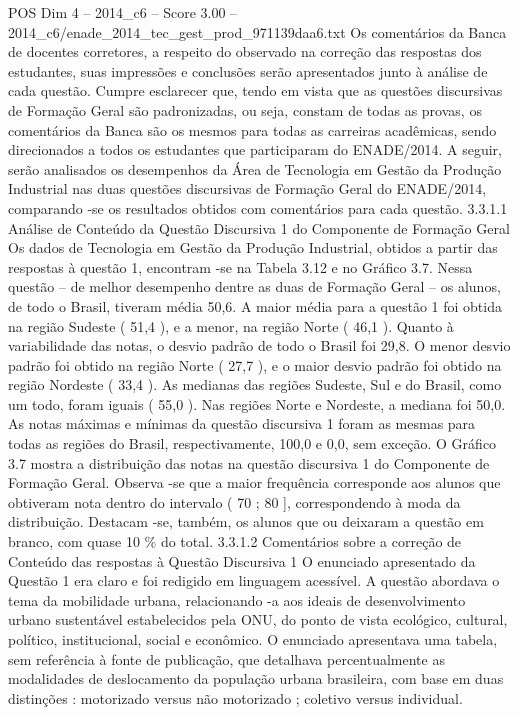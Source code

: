 \begin{textsample}{POS Dim 4 – 2014\_c6 – Score 3.00 – 2014\_c6/enade\_2014\_tec\_gest\_prod\_971139daa6.txt}
Os comentários da Banca de docentes corretores, a respeito do observado na correção das respostas dos estudantes, suas impressões e conclusões serão apresentados junto à análise de cada questão.
Cumpre esclarecer que, tendo em vista que as questões discursivas de Formação Geral são padronizadas, ou seja, constam de todas as provas, os comentários da Banca são os mesmos para todas as carreiras acadêmicas, sendo direcionados a todos os estudantes que participaram do ENADE/2014.
A seguir, serão analisados os desempenhos da Área de Tecnologia em Gestão da Produção Industrial nas duas questões discursivas de Formação Geral do ENADE/2014, comparando -se os resultados obtidos com comentários para cada questão. 3.3.1.1 Análise de Conteúdo da Questão Discursiva 1 do Componente de Formação Geral Os dados de Tecnologia em Gestão da Produção Industrial, obtidos a partir das respostas à questão 1, encontram -se na Tabela 3.12 e no Gráfico 3.7.
Nessa questão – de melhor desempenho dentre as duas de Formação Geral – os alunos, de todo o Brasil, tiveram média 50,6.
A maior média para a questão 1 foi obtida na região Sudeste ( 51,4 ), e a menor, na região Norte ( 46,1 ).
Quanto à variabilidade das notas, o desvio padrão de todo o Brasil foi 29,8.
O menor desvio padrão foi obtido na região Norte ( 27,7 ), e o maior desvio padrão foi obtido na região Nordeste ( 33,4 ).
As medianas das regiões Sudeste, Sul e do Brasil, como um todo, foram iguais ( 55,0 ).
Nas regiões Norte e Nordeste, a mediana foi 50,0.
As notas máximas e mínimas da questão discursiva 1 foram as mesmas para todas as regiões do Brasil, respectivamente, 100,0 e 0,0, sem exceção.
O Gráfico 3.7 mostra a distribuição das notas na questão discursiva 1 do Componente de Formação Geral.
Observa -se que a maior frequência corresponde aos alunos que obtiveram nota dentro do intervalo ( 70 ; 80 ], correspondendo à moda da distribuição.
Destacam -se, também, os alunos que ou deixaram a questão em branco, com quase 10 \% do total. 3.3.1.2 Comentários sobre a correção de Conteúdo das respostas à Questão Discursiva 1 O enunciado apresentado da Questão 1 era claro e foi redigido em linguagem acessível.
A questão abordava o tema da mobilidade urbana, relacionando -a aos ideais de desenvolvimento urbano sustentável estabelecidos pela ONU, do ponto de vista ecológico, cultural, político, institucional, social e econômico.
O enunciado apresentava uma tabela, sem referência à fonte de publicação, que detalhava percentualmente as modalidades de deslocamento da população urbana brasileira, com base em duas distinções : motorizado versus não motorizado ; coletivo versus individual.

\end{textsample}
